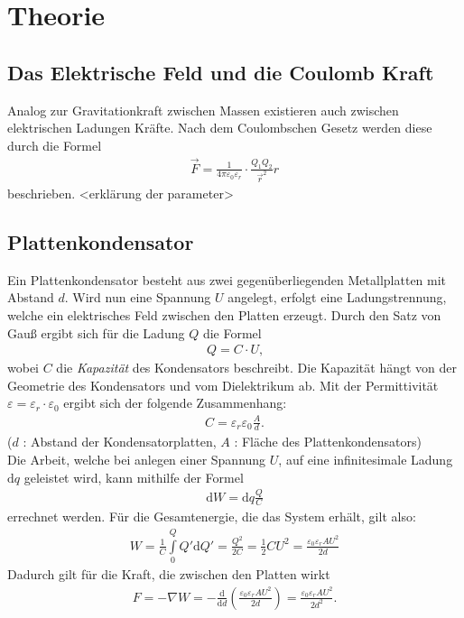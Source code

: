 \section{Theorie}
\subsection{Das Elektrische Feld und die Coulomb Kraft}
%
Analog zur Gravitationkraft zwischen Massen existieren auch zwischen elektrischen Ladungen Kräfte. Nach dem Coulombschen Gesetz werden diese durch die Formel
%
\begin{align}
	\vec{F} = \frac{1}{4\pi\varepsilon_0\varepsilon_r} \cdot \frac{Q_1 Q_2}{\vec{r}^2}\hat r
\end{align}
%
beschrieben. <erklärung der parameter>

%
\subsection{Plattenkondensator}
%
Ein Plattenkondensator besteht aus zwei gegenüberliegenden Metallplatten mit Abstand $d$. 
Wird nun eine Spannung $U$ angelegt, erfolgt eine Ladungstrennung, welche ein elektrisches Feld zwischen den Platten erzeugt. Durch den Satz von Gauß ergibt sich für die Ladung $Q$ die Formel
%
\begin{align}
	Q = C \cdot U\text{,}
\end{align}
%
wobei $C$ die \textit{Kapazität} des Kondensators beschreibt. Die Kapazität hängt von der Geometrie des Kondensators und vom Dielektrikum ab. Mit der Permittivität $\varepsilon = \varepsilon_r\cdot\varepsilon_0$ ergibt sich der folgende Zusammenhang:
%
\begin{align}
	C = \varepsilon_r \varepsilon_0 \frac{A}{d} \text{.}
\end{align}
%
($d$ : Abstand der Kondensatorplatten, $A$ : Fläche des Plattenkondensators)\\
%
Die Arbeit, welche bei anlegen einer Spannung $U$, auf eine infinitesimale Ladung $\text{d}q$ geleistet wird, kann mithilfe der Formel
%
\begin{align}
	\text{d}W = \text{d}q\frac{Q}{C}
\end{align}
%
errechnet werden. Für die Gesamtenergie, die das System erhält, gilt also:
%
\begin{align}
	W = \frac{1}{C} \int\limits_0^Q Q' \text{d}Q' = \frac{Q^2}{2C} = \frac{1}{2}CU^2 = \frac{\varepsilon_0\varepsilon_rAU^2}{2d} 
\end{align}
%
Dadurch gilt für die Kraft, die zwischen den Platten wirkt
%
\begin{align}
	F = -\nabla W = - \frac{\text{d}}{\text{d}d} \left(\frac{\varepsilon_0\varepsilon_rAU^2}{2d}\right) = \frac{\varepsilon_0\varepsilon_rAU^2}{2d^2} \text{.}
\end{align}
%
